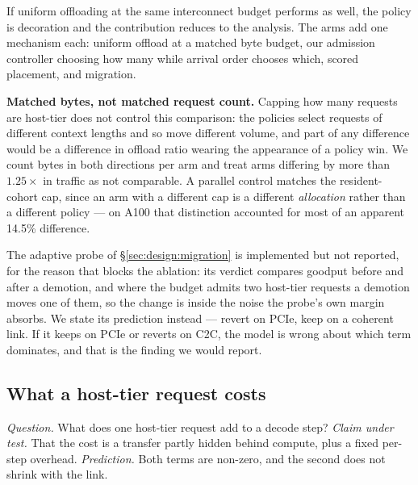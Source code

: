 If uniform offloading at the same interconnect budget performs as well, the policy
is decoration and the contribution reduces to the analysis. The arms add one
mechanism each: uniform offload at a matched byte budget, our admission controller
choosing how many while arrival order chooses which, scored placement, and
migration.

\textbf{Matched bytes, not matched request count.} Capping how many requests are
host-tier does not control this comparison: the policies select requests of
different context lengths and so move different volume, and part of any difference
would be a difference in offload ratio wearing the appearance of a policy win. We
count bytes in both directions per arm and treat arms differing by more than
$1.25\times$ in traffic as not comparable. A parallel control matches the
resident-cohort cap, since an arm with a different cap is a different
\emph{allocation} rather than a different policy --- on A100 that distinction
accounted for most of an apparent 14.5\% difference.

The adaptive probe of \S\ref{sec:design:migration} is implemented but not reported,
for the reason that blocks the ablation: its verdict compares goodput before and
after a demotion, and where the budget admits two host-tier requests a demotion
moves one of them, so the change is inside the noise the probe's own margin absorbs.
We state its prediction instead --- revert on PCIe, keep on a coherent link. If it
keeps on PCIe or reverts on C2C, the model is wrong about which term dominates, and
that is the finding we would report.

\subsection{What a host-tier request costs}
\label{sec:eval:cost}

\emph{Question.} What does one host-tier request add to a decode step?
\emph{Claim under test.} That the cost is a transfer partly hidden behind
compute, plus a fixed per-step overhead. \emph{Prediction.} Both terms are
non-zero, and the second does not shrink with the link.

